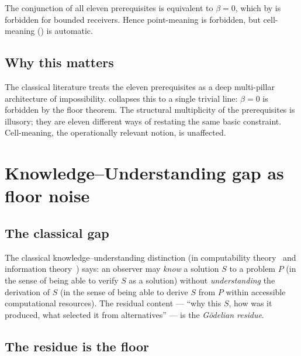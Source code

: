 \documentclass[11pt,twocolumn,a4paper]{article}
\begin{document}
\begin{corollary}\label{cor:master}
The conjunction of all eleven prerequisites is equivalent to
$\beta=0$, which by  is forbidden for bounded
receivers. Hence point-meaning is forbidden, but cell-meaning
() is automatic.
\end{corollary}

\subsection{Why this matters}

\begin{remark}\label{rem:rhetoric}
The classical literature treats the eleven prerequisites as a deep
multi-pillar architecture of impossibility. 
collapses this to a single trivial line: $\beta=0$ is forbidden by
the floor theorem. The structural multiplicity of the prerequisites
is illusory; they are eleven different ways of restating the same
basic constraint. Cell-meaning, the operationally relevant notion,
is unaffected.
\end{remark}

\section{Knowledge--Understanding gap as floor noise}
\label{sec:godel}

\subsection{The classical gap}

The classical knowledge--understanding distinction (in computability
theory~\cite{turing1936,godel1931} and information
theory~\cite{chaitin1974}) says: an observer may \emph{know} a
solution $S$ to a problem $P$ (in the sense of being able to verify
$S$ as a solution) without \emph{understanding} the derivation of $S$
(in the sense of being able to derive $S$ from $P$ within accessible
computational resources). The residual content --- ``why this $S$,
how was it produced, what selected it from alternatives'' --- is the
\emph{Gödelian residue}.

\subsection{The residue is the floor}
\end{document}
